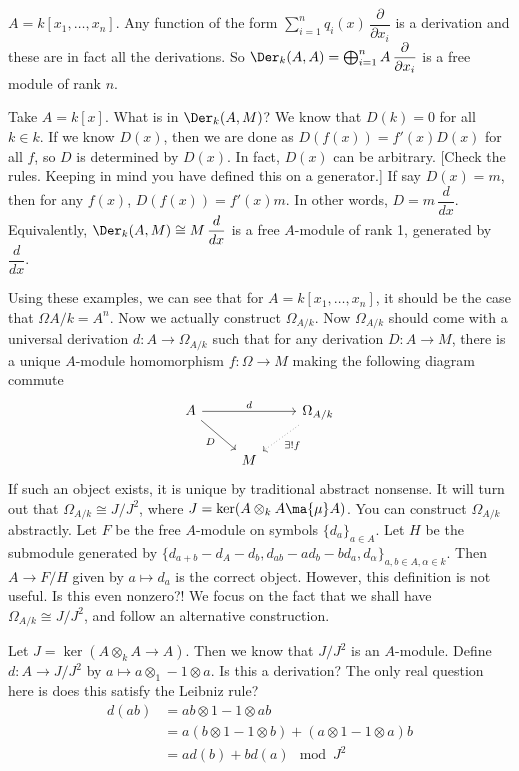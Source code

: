 \begin{ex}
$A= k[x_1,\ldots,x_n]$. Any function of the form $\sum_{i=1}^n q_i(x) \, \dfrac{\partial}{\partial x_i}$ is a derivation and these are in fact all the derivations. So $\Der_k(A,A)= \bigoplus_{i=1}^n A \, \dfrac{\partial}{\partial x_i}$ is a free module of rank $n$. 
\end{ex}


\begin{ex}
Take $A= k[x]$. What is in $\Der_k(A,M)$? We know that $D(k)=0$ for all $k \in k$. If we know $D(x)$, then we are done as $D(f(x))= f'(x) D(x)$ for all $f$, so $D$ is determined by $D(x)$. In fact, $D(x)$ can be arbitrary. [Check the rules. Keeping in mind you have defined this on a generator.] If say $D(x)= m$, then for any $f(x)$, $D(f(x))= f'(x) m$. In other words, $D= m \, \dfrac{d}{dx}$. Equivalently, $\Der_k(A,M) \cong M \, \dfrac{d}{dx}$ is a free $A$-module of rank 1, generated by $\dfrac{d}{dx}$. 
\end{ex}


Using these examples, we can see that for $A= k[x_1,\ldots,x_n]$, it should be the case that $\Omega{A/k}= A^n$. Now we actually construct $\Omega_{A/k}$. Now $\Omega_{A/k}$ should come with a universal derivation $d: A \to \Omega_{A/k}$ such that for any derivation $D: A \to M$, there is a unique $A$-module homomorphism $f: \Omega \to M$ making the following diagram commute
	\[
	\begin{tikzcd}
	A \arrow{rr}{d} \arrow[swap]{dr}{D} & & \Omega_{A/k} \arrow[dotted]{dl}{\exists! f} \\
	& M & 
	\end{tikzcd}
	\]
If such an object exists, it is unique by traditional abstract nonsense. It will turn out that $\Omega_{A/k} \cong J/J^2$, where $J= \ker(A \otimes_k A \ma{\mu} A)$. You can construct $\Omega_{A/k}$ abstractly. Let $F$ be the free $A$-module on symbols $\{ d_a \}_{a \in A}$. Let $H$ be the submodule generated by $\{d_{a+b} - d_A - d_b, d_{ab} - ad_b - bd_a, d_\alpha\}_{a,b \in A, \alpha \in k}$. Then $A \to F/H$ given by $a \mapsto d_a$ is the correct object. However, this definition is not useful. Is this even nonzero?! We focus on the fact that we shall have $\Omega_{A/k} \cong J/J^2$, and follow an alternative construction. 


Let $J = \ker(A \otimes_k A \to A)$. Then we know that $J/J^2$ is an $A$-module. Define $d: A \to J/J^2$ by $a \mapsto a \otimes_1 - 1 \otimes a$. Is this a derivation? The only real question here is does this satisfy the Leibniz rule?
	\[
	\begin{split}
	d(ab) &= ab \otimes 1 - 1 \otimes ab \\
	&= a(b\otimes 1 - 1\otimes b) + (a\otimes1 - 1\otimes a)b \\
	&= a d(b) + b d(a) \mod J^2
	\end{split} 
	\]


